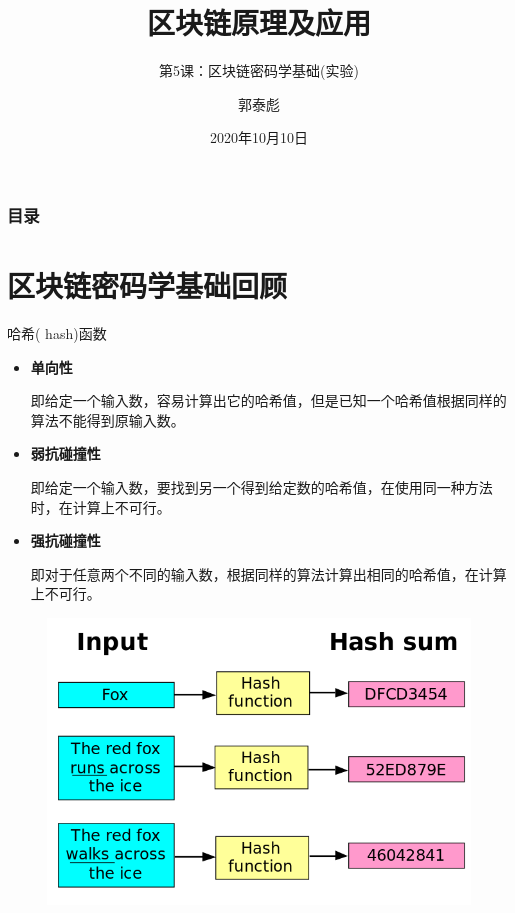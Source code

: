 \documentclass[11pt]{beamer}
\author{郭泰彪}
\title{区块链原理及应用}
\subtitle{第5课：区块链密码学基础(实验)}
\institute[湖工商大数据研究院]{湖南工商大学大数据与互联网创新研究院}
\date{2020年10月10日}
\begin{document}
\begin{frame}[plain]
	\maketitle
\end{frame}

\begin{frame}
	\frametitle{目录}
	\begin{multicols}{2}
		\tableofcontents[sectionstyle=show,subsectionstyle=show/shaded]
	\end{multicols}
\end{frame}

\section{区块链密码学基础回顾}

\begin{frame}{哈希( hash)函数}
	\begin{minipage}[t]{0.5\linewidth}
		\begin{itemize}
			\item \textbf{单向性}
			
			{\scriptsize 即给定一个输入数，容易计算出它的哈希值，但是已知一个哈希值根据同样的算法不能得到原输入数}。
			
			\item \textbf{弱抗碰撞性}
			
			{\scriptsize 即给定一个输入数，要找到另一个得到给定数的哈希值，在使用同一种方法时，在计算上不可行。}
			
			\item \textbf{强抗碰撞性}
			
			{\scriptsize 即对于任意两个不同的输入数，根据同样的算法计算出相同的哈希值，在计算上不可行}。
		\end{itemize}
	\end{minipage}%
	\begin{minipage}[t]{0.5\linewidth}
	\begin{figure}
		\centering
		\includegraphics[width=0.7\linewidth]{figures/Hashfunction}
		\label{fig:hashfunction}
	\end{figure}
\end{minipage}%
\end{frame}
\end{document}
